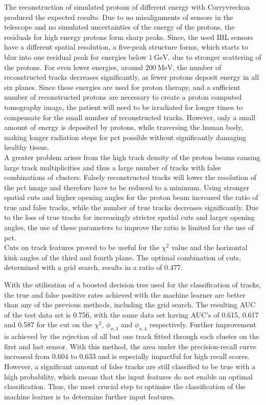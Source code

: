 The reconstruction of simulated protons of different energy with Corryvreckan produced the expected results. Due to no misalignments of sensors in the telescope and no simulated uncertainties
of the energy of the protons, the residuals for high energy protons form sharp peaks. Since, the used IBL sensors have a different spatial resolution, a five-peak structure
forms, which starts to blur into one residual peak for energies below $\SI{1}{\giga\eV}$, due to stronger scattering of the protons. For even lower energies,
around $\SI{200}{\mega\eV}$, the number of reconstructed tracks decreases significantly, as fewer protons deposit energy in all six planes. Since these energies are
used for proton therapy, and a sufficient number of reconstructed protons are necessary to create a proton computed tomography image, the patient
will need to be irradiated for longer times to compensate for the small number of reconstructed tracks. However, only a small amount of energy is deposited by protons, while traversing
the human body, making longer radiation steps for pct possible without significantly damaging healthy tissue. \\
A greater problem arises from the high track density of the proton beams causing large track multiplicities and thus a large number of tracks with false combinations of
clusters. Falsely reconstructed tracks will lower the resolution of the pct image and therefore have to be reduced to a minimum. Using stronger spatial cuts and higher
opening angles for the proton beam increased the ratio of true and false tracks, while the number of true tracks decreases significantly. Due to the loss of
true tracks for increasingly stricter spatial cuts and larger opening angles, the use of these parameters to improve the ratio is limited for the use of pct. \\
Cuts on track features proved to be useful for the $\chi^2$ value and the horizontal kink angles of the third and fourth plane. The optimal combination of cuts, determined
with a grid search, results in a ratio of 0.477.

With the utilisation of a boosted decision tree used for the classification of tracks, the true and false positive rates achieved with the machine learner are better
than any of the previous methods, including the grid search. The resulting AUC of the test data set is 0.756, with the same data set having AUC's of
0.615, 0.617 and 0.587 for the cut on the $\chi^2$, $\phi_{x,3}$ and $\phi_{x,4}$ respectively. Further improvement is achieved by the rejection of all but one track
fitted through each cluster on the first and last sensor. With this method, the area under the precision-recall curve increased from $0.604$ to $0.633$ and is especially
impactful for high recall scores. \\
However, a significant amount of false tracks are still classified to be true
with a high probability, which means that the input features do not enable an optimal classification.
Thus, the most crucial step to optimise the classification of the machine learner is to determine further input features. 

